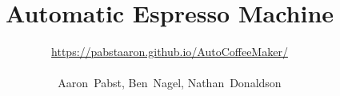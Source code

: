 \documentclass[conference]{IEEEtran}
\begin{document}
\title{Automatic Espresso Machine}

\author{\url{https://pabstaaron.github.io/AutoCoffeeMaker/} \\ \\ Aaron~Pabst, Ben~Nagel, Nathan~Donaldson}




% 
\end{document}
